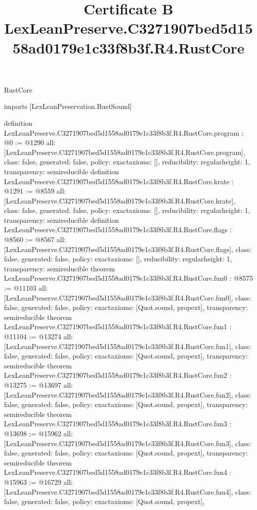\begin{lexlean}{RustCore}
\title{Certificate B LexLeanPreserve.C3271907bed5d1558ad0179e1c33f8b3f.R4.RustCore}
\begin{coremodule}
imports [LexLeanPreservation.RustSound]

definition LexLeanPreserve.C3271907bed5d1558ad0179e1c33f8b3f.R4.RustCore.program : @0 := @1290 {
  all: [LexLeanPreserve.C3271907bed5d1558ad0179e1c33f8b3f.R4.RustCore.program],
  class: false,
  generated: false,
  policy: exact{axioms: []},
  reducibility: regular{height: 1},
  transparency: semireducible
}
definition LexLeanPreserve.C3271907bed5d1558ad0179e1c33f8b3f.R4.RustCore.krate : @1291 := @8559 {
  all: [LexLeanPreserve.C3271907bed5d1558ad0179e1c33f8b3f.R4.RustCore.krate],
  class: false,
  generated: false,
  policy: exact{axioms: []},
  reducibility: regular{height: 1},
  transparency: semireducible
}
definition LexLeanPreserve.C3271907bed5d1558ad0179e1c33f8b3f.R4.RustCore.flags : @8560 := @8567 {
  all: [LexLeanPreserve.C3271907bed5d1558ad0179e1c33f8b3f.R4.RustCore.flags],
  class: false,
  generated: false,
  policy: exact{axioms: []},
  reducibility: regular{height: 1},
  transparency: semireducible
}
theorem LexLeanPreserve.C3271907bed5d1558ad0179e1c33f8b3f.R4.RustCore.fun0 : @8575 := @11103 {
  all: [LexLeanPreserve.C3271907bed5d1558ad0179e1c33f8b3f.R4.RustCore.fun0],
  class: false,
  generated: false,
  policy: exact{axioms: [Quot.sound, propext]},
  transparency: semireducible
}
theorem LexLeanPreserve.C3271907bed5d1558ad0179e1c33f8b3f.R4.RustCore.fun1 : @11104 := @13274 {
  all: [LexLeanPreserve.C3271907bed5d1558ad0179e1c33f8b3f.R4.RustCore.fun1],
  class: false,
  generated: false,
  policy: exact{axioms: [Quot.sound, propext]},
  transparency: semireducible
}
theorem LexLeanPreserve.C3271907bed5d1558ad0179e1c33f8b3f.R4.RustCore.fun2 : @13275 := @13697 {
  all: [LexLeanPreserve.C3271907bed5d1558ad0179e1c33f8b3f.R4.RustCore.fun2],
  class: false,
  generated: false,
  policy: exact{axioms: [Quot.sound, propext]},
  transparency: semireducible
}
theorem LexLeanPreserve.C3271907bed5d1558ad0179e1c33f8b3f.R4.RustCore.fun3 : @13698 := @15962 {
  all: [LexLeanPreserve.C3271907bed5d1558ad0179e1c33f8b3f.R4.RustCore.fun3],
  class: false,
  generated: false,
  policy: exact{axioms: [Quot.sound, propext]},
  transparency: semireducible
}
theorem LexLeanPreserve.C3271907bed5d1558ad0179e1c33f8b3f.R4.RustCore.fun4 : @15963 := @16729 {
  all: [LexLeanPreserve.C3271907bed5d1558ad0179e1c33f8b3f.R4.RustCore.fun4],
  class: false,
  generated: false,
  policy: exact{axioms: [Quot.sound, propext]},
}
\end{coremodule}
\end{lexlean}
